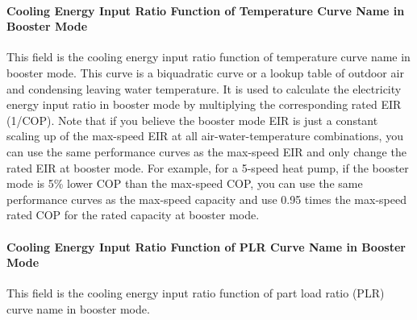 \paragraph{Cooling Energy Input Ratio Function of Temperature Curve Name in
Booster Mode} This field is the cooling energy input ratio function of
temperature curve name in booster mode. This curve is a biquadratic curve or a
lookup table of outdoor air and condensing leaving water temperature. It is used
to calculate the electricity energy input ratio in booster mode by multiplying
the corresponding rated EIR (1/COP). Note that if you believe the booster mode
EIR is just a constant scaling up of the max-speed EIR at all
air-water-temperature combinations, you can use the same performance curves as
the max-speed EIR and only change the rated EIR at booster mode.
For example, for a 5-speed heat pump, if the booster mode is 5\% lower COP 
than the max-speed COP, you can use the same performance curves as the max-speed
capacity and use 0.95 times the max-speed rated COP for the rated capacity at booster mode.
\paragraph{Cooling Energy Input Ratio Function of PLR Curve Name in Booster
Mode} This field is the cooling energy input ratio function of part load ratio
(PLR) curve name in booster mode.


